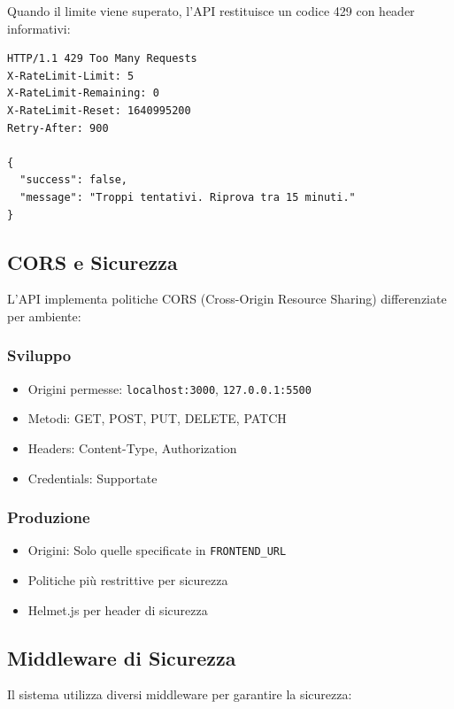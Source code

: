 Quando il limite viene superato, l'API restituisce un codice 429 con header informativi:
\begin{lstlisting}[style=httpstyle, caption=Response Headers Rate Limiting]
HTTP/1.1 429 Too Many Requests
X-RateLimit-Limit: 5
X-RateLimit-Remaining: 0
X-RateLimit-Reset: 1640995200
Retry-After: 900

{
  "success": false,
  "message": "Troppi tentativi. Riprova tra 15 minuti."
}
\end{lstlisting}

\subsection{CORS e Sicurezza}
L'API implementa politiche CORS (Cross-Origin Resource Sharing) differenziate per ambiente:

\subsubsection{Sviluppo}
\begin{itemize}
    \item Origini permesse: \texttt{localhost:3000}, \texttt{127.0.0.1:5500}
    \item Metodi: GET, POST, PUT, DELETE, PATCH
    \item Headers: Content-Type, Authorization
    \item Credentials: Supportate
\end{itemize}

\subsubsection{Produzione}
\begin{itemize}
    \item Origini: Solo quelle specificate in \texttt{FRONTEND\_URL}
    \item Politiche più restrittive per sicurezza
    \item Helmet.js per header di sicurezza
\end{itemize}

\subsection{Middleware di Sicurezza}
Il sistema utilizza diversi middleware per garantire la sicurezza:

